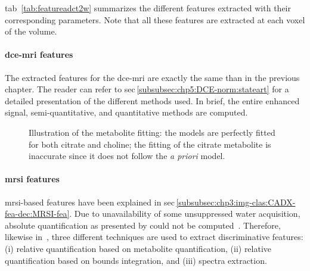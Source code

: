 \Acl{tab}~\ref{tab:featureadct2w} summarizes the different features extracted with their corresponding parameters.
Note that all these features are extracted at each voxel of the volume.

\paragraph{\ac{dce}-\ac{mri} features} The extracted features for the \ac{dce}-\ac{mri} are exactly the same than in the previous chapter.
The reader can refer to \ac{sec}\,\ref{subsubsec:chp5:DCE-norm:stateart} for a detailed presentation of the different methods used.
In brief, the entire enhanced signal, semi-quantitative, and quantitative methods are computed. 

\begin{figure}
  \hspace*{\fill}
  \hfill
  \hspace*{\fill}
  \caption[Illustration of the metabolite fitting.]{Illustration of the metabolite fitting:  the models are perfectly fitted for both citrate and choline;  the fitting of the citrate metabolite is inaccurate since it does not follow the \textit{a priori} model.}
  \label{fig:fitmeta}
\end{figure}

\paragraph{\ac{mrsi} features} \ac{mrsi}-based features have been explained in \acs{sec}\,\ref{subsubsec:chp3:img-clas:CADX-fea-dec:MRSI-fea}.
Due to unavailability of some unsuppressed water acquisition, absolute quantification as presented by \citeauthor{trigui2017automatic} could not be computed~\cite{trigui2017automatic}.
Therefore, likewise in~\cite{Parfait2012}, three different techniques are used to extract discriminative features: (i) relative quantification based on metabolite quantification, (ii) relative quantification based on bounds integration, and (iii) spectra extraction.


